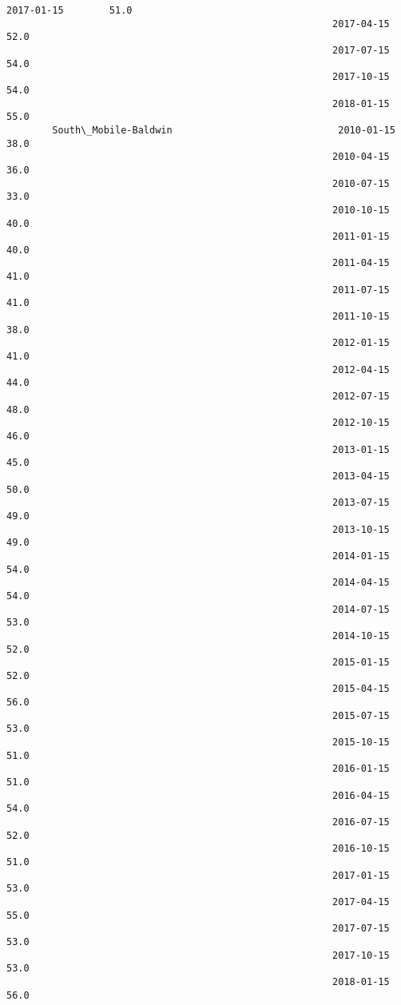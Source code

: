 \documentclass[11pt]{article}
\begin{document}
\begin{Verbatim}[commandchars=\\\{\}]
                                                         2017-01-15        51.0  
                                                         2017-04-15        52.0  
                                                         2017-07-15        54.0  
                                                         2017-10-15        54.0  
                                                         2018-01-15        55.0  
        South\_Mobile-Baldwin                             2010-01-15        38.0  
                                                         2010-04-15        36.0  
                                                         2010-07-15        33.0  
                                                         2010-10-15        40.0  
                                                         2011-01-15        40.0  
                                                         2011-04-15        41.0  
                                                         2011-07-15        41.0  
                                                         2011-10-15        38.0  
                                                         2012-01-15        41.0  
                                                         2012-04-15        44.0  
                                                         2012-07-15        48.0  
                                                         2012-10-15        46.0  
                                                         2013-01-15        45.0  
                                                         2013-04-15        50.0  
                                                         2013-07-15        49.0  
                                                         2013-10-15        49.0  
                                                         2014-01-15        54.0  
                                                         2014-04-15        54.0  
                                                         2014-07-15        53.0  
                                                         2014-10-15        52.0  
                                                         2015-01-15        52.0  
                                                         2015-04-15        56.0  
                                                         2015-07-15        53.0  
                                                         2015-10-15        51.0  
                                                         2016-01-15        51.0  
                                                         2016-04-15        54.0  
                                                         2016-07-15        52.0  
                                                         2016-10-15        51.0  
                                                         2017-01-15        53.0  
                                                         2017-04-15        55.0  
                                                         2017-07-15        53.0  
                                                         2017-10-15        53.0  
                                                         2018-01-15        56.0  
\end{Verbatim}
            
\end{document}
